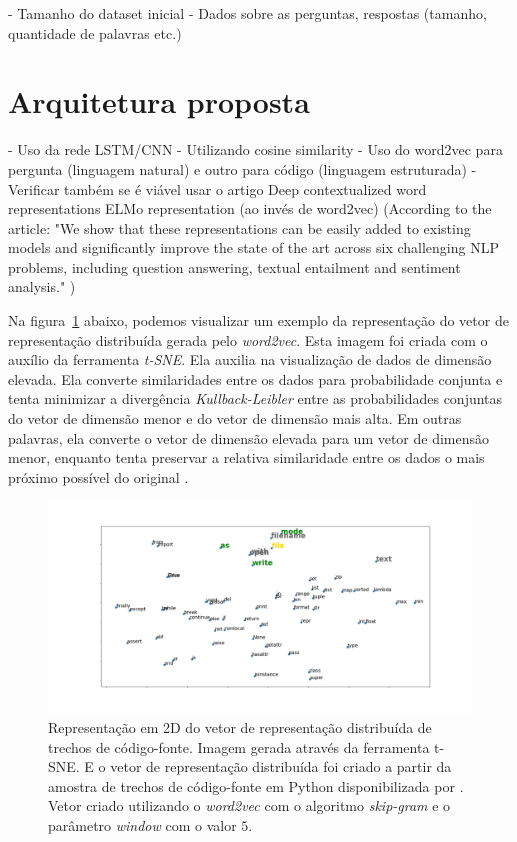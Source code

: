  - Tamanho do dataset inicial
 - Dados sobre as perguntas, respostas (tamanho, quantidade de palavras etc.)

\section{Arquitetura proposta} 

- Uso da rede LSTM/CNN 
       - Utilizando cosine similarity
       - Uso do word2vec para pergunta (linguagem natural) e outro para código (linguagem estruturada) - Verificar também se é viável usar o artigo Deep contextualized word representations ELMo representation (ao invés de word2vec) (According to the article: "We show that
these representations can be easily added to
existing models and significantly improve the
state of the art across six challenging NLP
problems, including question answering, textual entailment and sentiment analysis." )



Na figura~\ref{fig:tsne-code-snippet-python} abaixo, podemos visualizar um exemplo da representação do vetor de representação distribuída gerada pelo \textit{word2vec}. Esta imagem foi criada com o auxílio da ferramenta \textit{t-SNE}. Ela auxilia na visualização de dados de dimensão elevada. Ela converte similaridades entre os dados para probabilidade conjunta e tenta minimizar a divergência \emph{Kullback-Leibler} entre as probabilidades conjuntas do vetor de dimensão menor e do vetor de dimensão mais alta. Em outras palavras, ela converte o vetor de dimensão elevada para um vetor de dimensão menor, enquanto tenta preservar a relativa similaridade entre os dados o mais próximo possível do original \citep{scikit-learn-tsne-2019, quora-tsne-2019}.




\begin{figure}[h]
\includegraphics[width=1\textwidth]{figuras/cap-trabalhos-relacionados/code-tsne-output.png}
\caption{Representação em 2D do vetor de representação distribuída de trechos de código-fonte. Imagem gerada através da ferramenta t-SNE. E o vetor de representação distribuída foi criado a partir da amostra de trechos de código-fonte em Python disponibilizada por \cite{yao-2018}. Vetor criado utilizando o \textit{word2vec} com o algoritmo \textit{skip-gram} e o parâmetro \textit{window} com o valor $5$.}
\label{fig:tsne-code-snippet-python}
\end{figure}